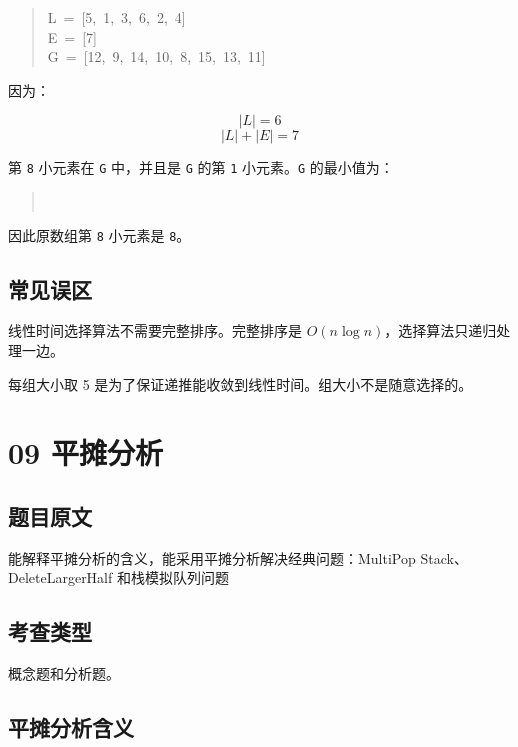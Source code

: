 \documentclass[UTF8,zihao=-4]{ctexart}
\begin{document}
\begin{quote}
\small\ttfamily\raggedright
\relax L\ =\ [5,\ 1,\ 3,\ 6,\ 2,\ 4]\\
\relax E\ =\ [7]\\
\relax G\ =\ [12,\ 9,\ 14,\ 10,\ 8,\ 15,\ 13,\ 11]\\
\end{quote}

因为：

\[|L| = 6\]
\[|L| + |E| = 7\]

第 \texttt{8} 小元素在 \texttt{G} 中，并且是 \texttt{G} 的第 \texttt{1} 小元素。\texttt{G} 的最小值为：

\begin{quote}
\small\ttfamily\raggedright
{}\\
\end{quote}

因此原数组第 \texttt{8} 小元素是 \texttt{8}。

\subsection*{常见误区}

线性时间选择算法不需要完整排序。完整排序是 $O(n \log n)$，选择算法只递归处理一边。

每组大小取 5 是为了保证递推能收敛到线性时间。组大小不是随意选择的。

\newpage

\section*{09 平摊分析}

\subsection*{题目原文}

能解释平摊分析的含义，能采用平摊分析解决经典问题：MultiPop Stack、DeleteLargerHalf 和栈模拟队列问题

\subsection*{考查类型}

概念题和分析题。

\subsection*{平摊分析含义}
\end{document}
